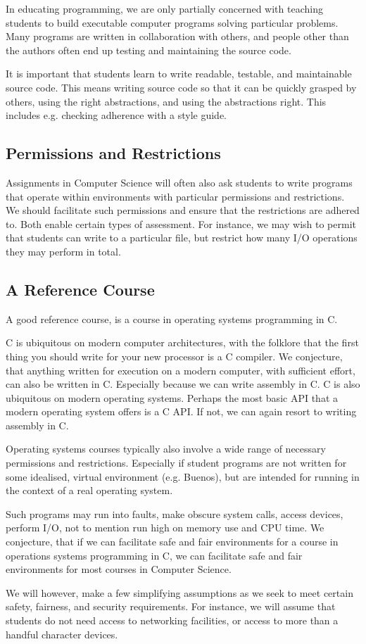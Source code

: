 In educating programming, we are only partially concerned with teaching
students to build executable computer programs solving particular problems.
Many programs are written in collaboration with others, and people other than
the authors often end up testing and maintaining the source code.

It is important that students learn to write readable, testable, and
maintainable source code. This means writing source code so that it can be
quickly grasped by others, using the right abstractions, and using the
abstractions right. This includes e.g. checking adherence with a style guide.

\subsection{Permissions and Restrictions}

Assignments in Computer Science will often also ask students to write programs
that operate within environments with particular permissions and restrictions.
We should facilitate such permissions and ensure that the restrictions are
adhered to. Both enable certain types of assessment. For instance, we may wish
to permit that students can write to a particular file, but restrict how many
I/O operations they may perform in total.

\subsection{A Reference Course}

A good reference course, is a course in operating systems programming in C.

C is ubiquitous on modern computer architectures, with the folklore that the
first thing you should write for your new processor is a C compiler. We
conjecture, that anything written for execution on a modern computer, with
sufficient effort, can also be written in C. Especially because we can write
assembly in C. C is also ubiquitous on modern operating systems. Perhaps the
most basic API that a modern operating system offers is a C API. If not, we can
again resort to writing assembly in C.

Operating systems courses typically also involve a wide range of necessary
permissions and restrictions. Especially if student programs are not written
for some idealised, virtual environment (e.g. Buenos), but are intended for
running in the context of a real operating system.

Such programs may run into faults, make obscure system calls, access devices,
perform I/O, not to mention run high on memory use and CPU time. We conjecture,
that if we can facilitate safe and fair environments for a course in operations
systems programming in C, we can facilitate safe and fair environments for most
courses in Computer Science.

We will however, make a few simplifying assumptions as we seek to meet certain
safety, fairness, and security requirements. For instance, we will assume that
students do not need access to networking facilities, or access to more than a
handful character devices.
